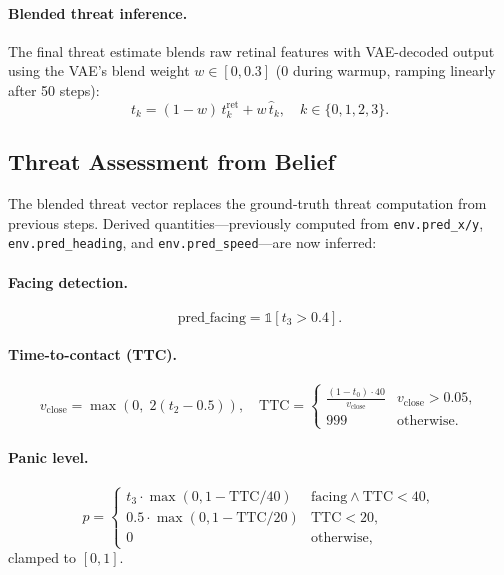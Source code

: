 \documentclass[11pt,a4paper]{article}
\begin{document}
\paragraph{Blended threat inference.}
The final threat estimate blends raw retinal features with VAE-decoded
output using the VAE's blend weight $w \in [0, 0.3]$ (0 during warmup,
ramping linearly after 50 steps):
\begin{equation}\label{eq:threat_blend}
  t_k = (1 - w)\,t_k^\text{ret} + w\,\hat{t}_k,
  \quad k \in \{0,1,2,3\}.
\end{equation}

\subsection{Threat Assessment from Belief}\label{sec:threat_assessment}

The blended threat vector replaces the ground-truth threat computation from
previous steps.
Derived quantities---previously computed from \texttt{env.pred\_x/y},
\texttt{env.pred\_heading}, and \texttt{env.pred\_speed}---are now
inferred:

\paragraph{Facing detection.}
\begin{equation}\label{eq:facing_infer}
  \text{pred\_facing} = \mathbb{1}[t_3 > 0.4].
\end{equation}

\paragraph{Time-to-contact (TTC).}
\begin{equation}\label{eq:ttc_infer}
  v_\text{close} = \max(0,\; 2(t_2 - 0.5)), \quad
  \text{TTC} = \begin{cases}
    \displaystyle\frac{(1 - t_0) \cdot 40}{v_\text{close}}
    & v_\text{close} > 0.05, \\[4pt]
    999 & \text{otherwise}.
  \end{cases}
\end{equation}

\paragraph{Panic level.}
\begin{equation}\label{eq:panic_infer}
  p = \begin{cases}
    t_3 \cdot \max(0, 1 - \text{TTC}/40) & \text{facing} \wedge \text{TTC} < 40, \\
    0.5 \cdot \max(0, 1 - \text{TTC}/20) & \text{TTC} < 20, \\
    0 & \text{otherwise},
  \end{cases}
\end{equation}
clamped to $[0, 1]$.
\end{document}

